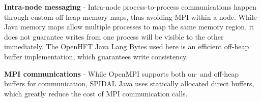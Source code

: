 \textbf{Intra-node messaging} - Intra-node process-to-process communications happen through custom off heap memory maps, thus avoiding MPI within a node. While Java memory maps allow multiple processes to map the same memory region, it does not guarantee writes from one process will be visible to the other immediately. The OpenHFT Java Lang Bytes \cite{openhftjavalang} used here is an efficient off-heap buffer implementation, which guarantees write consistency. 

\textbf{MPI communications} - While OpenMPI supports both on- and off-heap buffers for communication, SPIDAL Java uses statically allocated direct buffers, which greatly reduce the cost of MPI communication calls. 